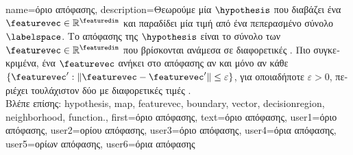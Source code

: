 {name={\foreignlanguage{greek}{όριο απόφασης}}, 
	description={\foreignlanguage{greek}{Θεωρούμε μία}  
		  $\hypothesis$ \foreignlanguage{greek}{που διαβάζει ένα}   
		$\featurevec \in \mathbb{R}^{\featuredim}$ \foreignlanguage{greek}{και παραδίδει μία τιμή από ένα πεπερασμένο σύνολο $\labelspace$. 
		Το}  \foreignlanguage{greek}{απόφασης της $\hypothesis$ είναι το σύνολο των}  
		$\featurevec \in \mathbb{R}^{\featuredim}$ \foreignlanguage{greek}{που βρίσκονται ανάμεσα σε διαφορετικές} . 
		\foreignlanguage{greek}{Πιο συγκεκριμένα, ένα}  $\featurevec$ \foreignlanguage{greek}{ανήκει στο} 
		 \foreignlanguage{greek}{απόφασης αν και μόνο αν κάθε}  
		$\{ \featurevec': \| \featurevec - \featurevec' \| \leq \varepsilon \}$, \foreignlanguage{greek}{για οποιαδήποτε $\varepsilon >0$, περιέχει 
		τουλάχιστον δύο}  \foreignlanguage{greek}{με διαφορετικές τιμές} .
		\\
		\foreignlanguage{greek}{Βλέπε επίσης:} \gls{hypothesis}, \gls{map}, \gls{featurevec}, \gls{boundary}, \gls{vector}, \gls{decisionregion}, 
		\gls{neighborhood}, \gls{function}.},
	first={\foreignlanguage{greek}{όριο απόφασης}},
	text={\foreignlanguage{greek}{όριο απόφασης}},
	user1={\foreignlanguage{greek}{όριο απόφασης}}, %
	user2={\foreignlanguage{greek}{ορίου απόφασης}}, %
	user3={\foreignlanguage{greek}{όριο απόφασης}}, %
	user4={\foreignlanguage{greek}{όρια απόφασης}}, %
	user5={\foreignlanguage{greek}{ορίων απόφασης}}, %
	user6={\foreignlanguage{greek}{όρια απόφασης}} %
}

